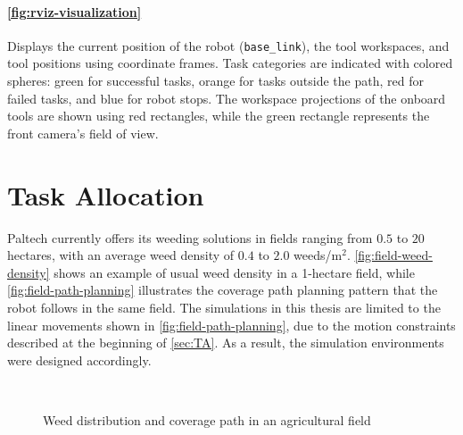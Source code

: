 \paragraph{\autoref{fig:rviz-visualization}} Displays the current position of the robot (\texttt{base\_link}), the tool workspaces, and tool positions using coordinate frames. Task categories are indicated with colored spheres: green for successful tasks, orange for tasks outside the path, red for failed tasks, and blue for robot stops. The workspace projections of the onboard tools are shown using red rectangles, while the green rectangle represents the front camera’s field of view.

\section{Task Allocation}
Paltech currently offers its weeding solutions in fields ranging from $0.5$ to $20$ hectares, with an average weed density of $0.4$ to $2.0$ weeds/m$^2$. \autoref{fig:field-weed-density} shows an example of usual weed density in a 1-hectare field, while \autoref{fig:field-path-planning} illustrates the coverage path planning pattern that the robot follows in the same field. The simulations in this thesis are limited to the linear movements shown in \ref{fig:field-path-planning}, due to the motion constraints described at the beginning of \autoref{sec:TA}. As a result, the simulation environments were designed accordingly.

\begin{figure}[H]
    \myfloatalign
     \quad
     \\
    \caption{Weed distribution and coverage path in an agricultural field}\label{fig:usual-field-example}
\end{figure}

